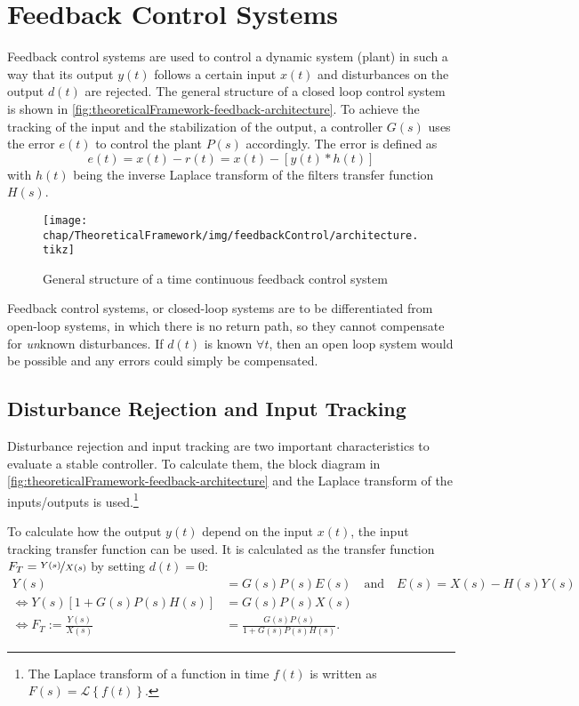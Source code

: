 \section{Feedback Control Systems}
Feedback control systems are used to control a dynamic system (plant) in such a way that its output $y(t)$ follows a certain input $x(t)$ and disturbances on the output $d(t)$ are rejected. The general structure of a closed loop control system is shown in \autoref{fig:theoreticalFramework-feedback-architecture}. To achieve the tracking of the input and the stabilization of the output, a controller $G(s)$ uses the error $e(t)$ to control the plant $P(s)$ accordingly.
The error is defined as
\begin{equation}
e(t)=x(t)-r(t) = x(t)-[y(t)\ast h(t)]
\end{equation}
with $h(t)$ being the inverse Laplace transform of the filters transfer function $H(s)$.

\begin{figure}[tb]
	\centering
	\texttt{[image: chap/TheoreticalFramework/img/feedbackControl/architecture.tikz]}
	\caption{General structure of a time continuous feedback control system}
	\label{fig:theoreticalFramework-feedback-architecture}
\end{figure}

Feedback control systems, or closed-loop systems are to be differentiated from open-loop systems, in which there is no return path, so they cannot compensate for \textit{un}known disturbances. If $d(t)$ is known $\forall t$, then an open loop system would be possible and any errors could simply be compensated.

\subsection{Disturbance Rejection and Input Tracking}
Disturbance rejection and input tracking are two important characteristics to evaluate a stable controller. To calculate them, the block diagram in \autoref{fig:theoreticalFramework-feedback-architecture} and the Laplace transform of the inputs/outputs is used.\footnote{The Laplace transform of a function in time $f(t)$ is written as $F(s)=\mathcal{L}\left\{f(t)\right\}$.} 

To calculate how the output $y(t)$ depend on the input $x(t)$, the input tracking transfer function can be used.\cite[p.~88]{Foellinger2016} It is calculated as the transfer function $F_T=\nicefrac{Y(s)}{X(s)}$ by setting $d(t)=0$:
\begin{align}
Y(s)&=G(s)P(s)E(s)\quad\text{and}\quad E(s)=X(s)-H(s)Y(s)\\
\Leftrightarrow Y(s)\left[1+G(s)P(s)H(s)\right]&=G(s)P(s)X(s)\\
\Leftrightarrow F_T:=\frac{Y(s)}{X(s)} &= \frac{G(s)P(s)}{1+G(s)P(s)H(s)}.
\end{align}

